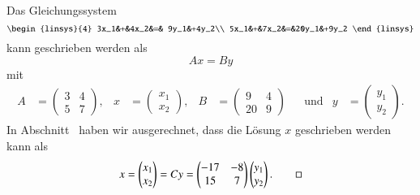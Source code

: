 \begin{beispiel}
Das Gleichungssystem 
\[
\begin{linsys}{4}
3x_1&+&4x_2&=& 9y_1&+4y_2\\
5x_1&+&7x_2&=&20y_1&+9y_2
\end{linsys}
\]
kann geschrieben werden als
\[
Ax=By
\]
mit
\[
\begin{aligned}
A&=\begin{pmatrix}3&4\\5&7\end{pmatrix},&
x&=\begin{pmatrix}x_1\\x_2\end{pmatrix},&
B&=\begin{pmatrix}9&4\\20&9\end{pmatrix}&
 &\text{und}&
y&=\begin{pmatrix}y_1\\y_2\end{pmatrix}.
\end{aligned}
\]
In Abschnitt~\label{subsection:rechte seite linear} haben wir ausgerechnet,
dass die Lösung $x$ geschrieben werden kann als
\[
x
=
\begin{pmatrix}x_1\\x_2\end{pmatrix}
=
Cy
=
\begin{pmatrix}
-17&-8\\15&7
\end{pmatrix}
\begin{pmatrix}
y_1\\y_2
\end{pmatrix}.
\qedhere
\]
\end{beispiel}

